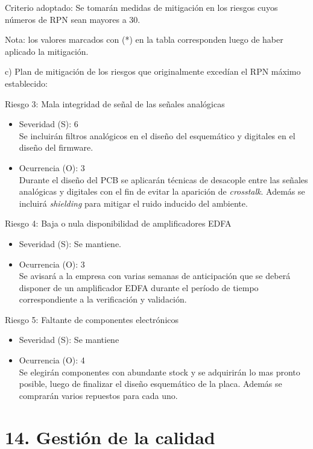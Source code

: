 \documentclass[
11pt, %
]{charter}
\begin{document}
Criterio adoptado: 
Se tomarán medidas de mitigación en los riesgos cuyos números de RPN sean mayores a 30.

Nota: los valores marcados con (*) en la tabla corresponden luego de haber aplicado la mitigación.

c) Plan de mitigación de los riesgos que originalmente excedían el RPN máximo establecido:

Riesgo 3: Mala integridad de señal de las señales analógicas
\begin{itemize}
	\item Severidad (S): 6 \\
	Se incluirán filtros analógicos en el diseño del esquemático y digitales en el diseño del firmware.
	\item Ocurrencia (O): 3 \\
	Durante el diseño del PCB se aplicarán técnicas de desacople entre las señales analógicas y digitales con el fin de evitar la aparición de \textit{crosstalk}. Además se incluirá \textit{shielding} para mitigar el ruido inducido del ambiente.
\end{itemize}

Riesgo 4: Baja o nula disponibilidad de amplificadores EDFA
\begin{itemize}
	\item Severidad (S): Se mantiene.
	\item Ocurrencia (O): 3 \\
	Se avisará a la empresa con varias semanas de anticipación que se deberá disponer de un amplificador EDFA durante el período de tiempo correspondiente a la verificación y validación.
\end{itemize}

Riesgo 5: Faltante de componentes electrónicos
\begin{itemize}
	\item Severidad (S): Se mantiene
	\item Ocurrencia (O): 4 \\
	Se elegirán componentes con abundante stock y se adquirirán lo mas pronto posible, luego de finalizar el diseño esquemático de la placa. Además se comprarán varios repuestos para cada uno.
\end{itemize}

\section{14. Gestión de la calidad}
\label{sec:calidad}
\end{document}
